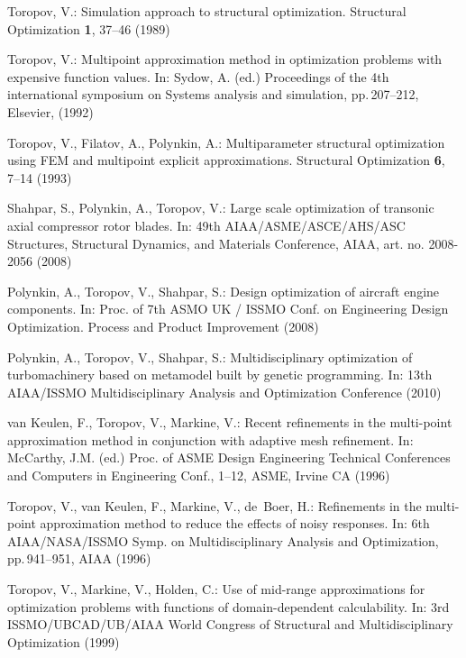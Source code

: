 \documentclass[a4paper]{llncs}
\begin{document}
\begin{thebibliography}{10}

Toropov, V.:
\newblock Simulation approach to structural optimization.
\newblock Structural Optimization \textbf{1}, 37--46 (1989)

Toropov, V.:
\newblock Multipoint approximation method in optimization problems with expensive function values.
\newblock In: Sydow, A. (ed.) Proceedings of the 4th international symposium on Systems analysis and simulation,
pp.\,207--212, Elsevier,  (1992)

Toropov, V., Filatov, A., Polynkin, A.:
\newblock Multiparameter structural optimization using FEM and multipoint explicit approximations.
\newblock Structural Optimization \textbf{6}, 7--14 (1993)

Shahpar, S., Polynkin, A., Toropov, V.:
\newblock Large scale optimization of transonic axial compressor rotor blades.
\newblock In:  49th AIAA/ASME/ASCE/AHS/ASC Structures, Structural Dynamics, and Materials Conference, AIAA, art. no. 2008-2056
(2008)

Polynkin, A., Toropov, V., Shahpar, S.:
\newblock Design optimization of aircraft engine components.
\newblock In: Proc. of 7th ASMO UK / ISSMO Conf. on Engineering Design Optimization. Process and Product Improvement
(2008)

Polynkin, A., Toropov, V., Shahpar, S.:
\newblock Multidisciplinary optimization of turbomachinery based on metamodel built by genetic programming.
\newblock In: 13th AIAA/ISSMO Multidisciplinary Analysis and Optimization Conference
(2010)

van Keulen, F., Toropov, V., Markine, V.:
\newblock Recent refinements in the multi-point approximation method in conjunction with adaptive mesh refinement.
\newblock In: McCarthy, J.M. (ed.) Proc. of ASME Design Engineering Technical Conferences and Computers
  in Engineering Conf., 1--12, ASME, Irvine CA (1996)

Toropov, V., van Keulen, F., Markine, V., de~Boer, H.:
\newblock Refinements in the multi-point approximation method to reduce the effects of noisy responses.
\newblock In: 6th AIAA/NASA/ISSMO Symp. on Multidisciplinary Analysis and Optimization,  pp.\,941--951, AIAA
(1996)

Toropov, V., Markine, V., Holden, C.:
\newblock Use of mid-range approximations for optimization problems with functions of domain-dependent calculability.
\newblock In: 3rd ISSMO/UBCAD/UB/AIAA World Congress of Structural and Multidisciplinary Optimization (1999)


\end{thebibliography}
\end{document}
